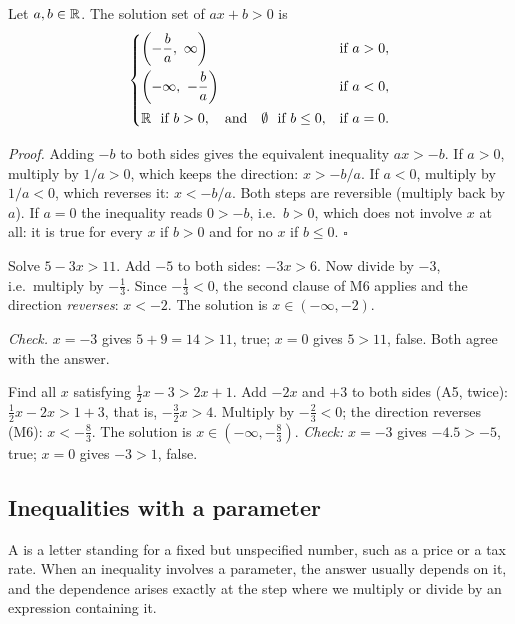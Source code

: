 \begin{proposition}
Let $a,b\in\mathbb{R}$. The solution set of $ax+b>0$ is
\[
\begin{cases}
\left(-\dfrac ba,\ \infty\right) & \text{if } a>0,\\[2ex]
\left(-\infty,\ -\dfrac ba\right) & \text{if } a<0,\\[2ex]
\mathbb{R}\ \text{ if } b>0,\quad\text{and}\quad \emptyset\ \text{ if } b\le0, & \text{if } a=0.
\end{cases}
\]
\end{proposition}
\emph{Proof.} Adding $-b$ to both sides gives the equivalent inequality $ax>-b$. If $a>0$, multiply by
$1/a>0$, which keeps the direction: $x>-b/a$. If $a<0$, multiply by $1/a<0$, which reverses it: $x<-b/a$.
Both steps are reversible (multiply back by $a$). If $a=0$ the inequality reads $0>-b$, i.e.\ $b>0$, which does
not involve $x$ at all: it is true for every $x$ if $b>0$ and for no $x$ if $b\le0$. \hfill$\square$

\begin{example}
Solve $5-3x>11$.
\solution
Add $-5$ to both sides: $-3x>6$. Now divide by $-3$, i.e.\ multiply by $-\tfrac13$. Since $-\tfrac13<0$, the
second clause of M6 applies and the direction \emph{reverses}: $x<-2$. The solution is $x\in(-\infty,-2)$.

\emph{Check.} $x=-3$ gives $5+9=14>11$, true; $x=0$ gives $5>11$, false. Both agree with the answer.
\end{example}

\begin{example}
Find all $x$ satisfying $\tfrac12x-3>2x+1$.
\solution
Add $-2x$ and $+3$ to both sides (A5, twice): $\tfrac12x-2x>1+3$, that is, $-\tfrac32x>4$. Multiply by
$-\tfrac23<0$; the direction reverses (M6): $x<-\tfrac83$. The solution is $x\in(-\infty,-\tfrac83)$.
\emph{Check:} $x=-3$ gives $-4.5>-5$, true; $x=0$ gives $-3>1$, false. 
\end{example}

\subsection{Inequalities with a parameter}

A  is a letter standing for a fixed but unspecified number, such as a price or a tax rate.
When an inequality involves a parameter, the answer usually depends on it, and the dependence arises exactly
at the step where we multiply or divide by an expression containing it.

